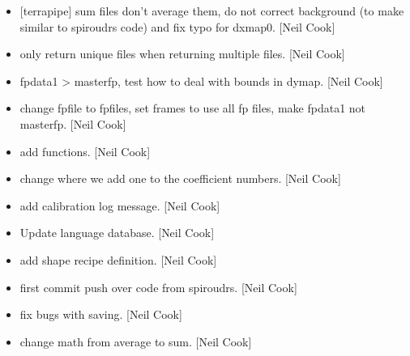 \documentclass[a4paper,10pt,english]{report}
\begin{document}
\begin{itemize}
\item {} 
 {[}terrapipe{]} \sphinxhyphen{} sum files don’t average them,
do not correct background (to make similar to spiroudrs code) and fix
typo for dxmap0. {[}Neil Cook{]}

\item {} 
 \sphinxhyphen{} only return unique files when returning multiple
files. {[}Neil Cook{]}

\item {} 
 \sphinxhyphen{} fpdata1 \textendash{}\textgreater{} masterfp, test how to deal with bounds in
dymap. {[}Neil Cook{]}

\item {} 
 \sphinxhyphen{} change fpfile to fpfiles, set frames to
use all fp files, make fpdata1 not masterfp. {[}Neil Cook{]}

\item {} 
 \sphinxhyphen{} add  functions. {[}Neil Cook{]}

\item {} 
 \sphinxhyphen{} change where we add one to the
coefficient numbers. {[}Neil Cook{]}

\item {} 
 \sphinxhyphen{} add calibration log message. {[}Neil Cook{]}

\item {} 
Update language database. {[}Neil Cook{]}

\item {} 
 \sphinxhyphen{} add
shape  recipe definition. {[}Neil Cook{]}

\item {} 
 \sphinxhyphen{} first commit \sphinxhyphen{} push over code from spiroudrs.
{[}Neil Cook{]}

\item {} 
 \sphinxhyphen{} fix bugs with saving. {[}Neil Cook{]}

\item {} 
 \sphinxhyphen{} change math from average to sum. {[}Neil Cook{]}

\end{itemize}
\end{document}
